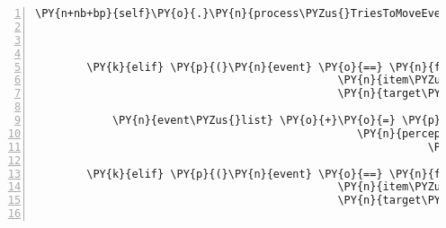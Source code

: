 \begin{Verbatim}[commandchars=\\\{\},numbers=left,firstnumber=1,stepnumber=1]
            \PY{n+nb+bp}{self}\PY{o}{.}\PY{n}{process\PYZus{}TriesToMoveEvent}\PY{p}{(}\PY{n}{fabula}\PY{o}{.}\PY{n}{TriesToMoveEvent}\PY{p}{(}\PY{n}{identifier}\PY{o}{=}\PY{l+s}{\PYZsq{}}\PY{l+s}{spider}\PY{l+s}{\PYZsq{}}\PY{p}{,}
                                                                  \PY{n}{target\PYZus{}identifier}\PY{o}{=}\PY{p}{(}\PY{l+m+mi}{0}\PY{p}{,} \PY{l+m+mi}{4}\PY{p}{)}\PY{p}{)}\PY{p}{)}


        \PY{k}{elif} \PY{p}{(}\PY{n}{event} \PY{o}{==} \PY{n}{fabula}\PY{o}{.}\PY{n}{TriesToDropEvent}\PY{p}{(}\PY{n}{identifier}\PY{o}{=}\PY{n}{ID\PYZus{}CASSANDRA}\PY{p}{,}
                                               \PY{n}{item\PYZus{}identifier}\PY{o}{=}\PY{l+s}{\PYZsq{}}\PY{l+s}{cobweb}\PY{l+s}{\PYZsq{}}\PY{p}{,}
                                               \PY{n}{target\PYZus{}identifier}\PY{o}{=}\PY{l+s}{\PYZsq{}}\PY{l+s}{door\PYZus{}unlocked}\PY{l+s}{\PYZsq{}}\PY{p}{)}\PY{p}{)}\PY{p}{:}

            \PY{n}{event\PYZus{}list} \PY{o}{+}\PY{o}{=} \PY{p}{[}\PY{n}{fabula}\PY{o}{.}\PY{n}{PerceptionEvent}\PY{p}{(}\PY{n}{identifier}\PY{o}{=}\PY{n}{ID\PYZus{}CASSANDRA}\PY{p}{,}
                                                  \PY{n}{perception}\PY{o}{=}\PY{l+s}{\PYZsq{}}\PY{l+s}{Ich bin froh, dass die Tür offen ist, }\PY{l+s}{\PYZsq{}}
                                                             \PY{l+s}{\PYZsq{}}\PY{l+s}{die möchte ich nicht wieder zu kleben.}\PY{l+s}{\PYZsq{}}\PY{p}{)}\PY{p}{]}

        \PY{k}{elif} \PY{p}{(}\PY{n}{event} \PY{o}{==} \PY{n}{fabula}\PY{o}{.}\PY{n}{TriesToDropEvent}\PY{p}{(}\PY{n}{identifier}\PY{o}{=}\PY{n}{ID\PYZus{}CASSANDRA}\PY{p}{,}
                                               \PY{n}{item\PYZus{}identifier}\PY{o}{=}\PY{l+s}{\PYZsq{}}\PY{l+s}{cobweb}\PY{l+s}{\PYZsq{}}\PY{p}{,}
                                               \PY{n}{target\PYZus{}identifier}\PY{o}{=}\PY{n}{ID\PYZus{}CASSANDRA}\PY{p}{)}\PY{p}{)}\PY{p}{:}


\end{Verbatim}
